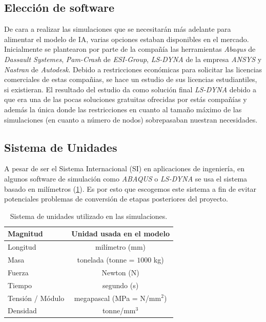 \documentclass[11pt]{article} %
\begin{document}
\subsection{Elección de software}
De cara a realizar las simulaciones que se necesitarán más adelante para alimentar el modelo de IA, varias opciones estaban disponibles en el mercado. Inicialmente se plantearon 
por parte de la compañía las herramientas \textit{Abaqus}\cite{abaqus} de \textit{Dassault Systemes}, \textit{Pam-Crash}\cite{pam-crash} de \textit{ESI-Group}, \textit{LS-DYNA}\cite{ls-dyna-web} de la empresa \textit{ANSYS} y \textit{Nastran}
de \textit{Autodesk}\cite{nastran}. Debido a restricciones económicas para solicitar las licencias comerciales de estas compañias, se hace un estudio de sus licencias estudiantiles, si existieran. El resultado del 
estudio da como solución final \textit{LS-DYNA} debido a que era una de las pocas soluciones gratuitas ofrecidas por estás compañías y además la única donde las restricciones en cuanto al
tamaño máximo de las simulaciones (en cuanto a número de nodos) sobrepasaban nuestran necesidades.

\subsection{Sistema de Unidades}

A pesar de ser el Sistema Internacional (SI) en aplicaciones de ingeniería, en algunos software de simulación como \textit{ABAQUS} o \textit{LS-DYNA} se usa el sistema basado en milímetros (\cref{tab:sistema-unidades}). 
Es por esto que escogemos este sistema a fin de evitar potenciales problemas de conversión de etapas posteriores del proyecto.

\begin{table}[h]
  \centering
  \begin{tabular}{l c}
    \toprule
    Magnitud & Unidad usada en el modelo \\
    \midrule
    Longitud & milímetro (mm) \\
    Masa & tonelada (tonne = $1000$ kg) \\
    Fuerza & Newton (N) \\
    Tiempo & segundo (s) \\
    Tensión / Módulo & megapascal (MPa = N/mm$^2$) \\
    Densidad & tonne/mm$^3$ \\
    \bottomrule
  \end{tabular}
  \caption{Sistema de unidades utilizado en las simulaciones.}
  \label{tab:sistema-unidades}
\end{table}
\end{document}
